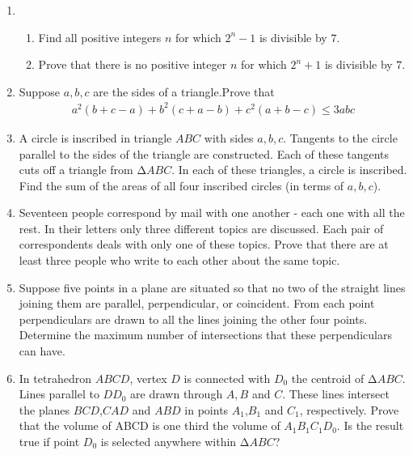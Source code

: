 \documentclass{article}
\begin{document}
\begin{enumerate}
\item 
\begin{enumerate}[label=(\alph*)]
\item Find all positive integers $n$ for which $2^n-1$ is divisible by $7$.
\item Prove that there is no positive integer $n$ for which $2^n + 1$ is divisible by $7$.
\end{enumerate}
\item Suppose $a, b, c$ are the sides of a triangle.Prove that  \begin{align*}
a^2(b+c-a)+b^2(c+a-b)+c^2(a+b-c)\le3abc 
\end{align*}
\item A circle is inscribed in triangle $ABC$ with sides $a, b, c$. Tangents to the circle parallel to the sides of the triangle are constructed. Each of these tangents cuts off a triangle from $∆ABC$. In each of these triangles, a circle is inscribed. Find the sum of the areas of all four inscribed circles (in terms of $a, b, c$).
\item Seventeen people correspond by mail with one another - each one with all the rest. In their letters only three different topics are discussed. Each pair of correspondents deals with only one of these topics. Prove that there are at least three people who write to each other about the same topic.
\item Suppose five points in a plane are situated so that no two of the straight lines joining them are parallel, perpendicular, or coincident. From each point perpendiculars are drawn to all the lines joining the other four points. Determine the maximum number of intersections that these perpendiculars can have.
\item In tetrahedron $ABCD$, vertex $D$ is connected with $D_0$ the centroid of $∆ABC$. Lines parallel to $DD_0$ are drawn through $A, B$ and $C$. These lines intersect the planes $BCD$,$CAD$ and $ABD$ in points $A_1$,$B_1$ and $C_1$, respectively. Prove that the volume of ABCD is one third the volume of $A_1 B_1 C_1 D_0$. Is the result true if point $D_0$ is selected anywhere within $∆ABC$?
\end{enumerate}
\end{document}

